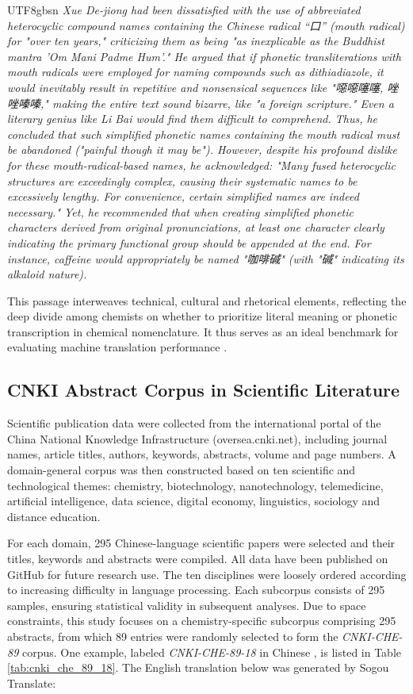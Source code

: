 \documentclass[conference]{IEEEtran}
\begin{document}
\begin{CJK}{UTF8}{gbsn}
\textit{Xue De-jiong had been dissatisfied with the use of abbreviated heterocyclic compound names containing the Chinese radical ``口'' (mouth radical) for "over ten years," criticizing them as being "as inexplicable as the Buddhist mantra 'Om Mani Padme Hum'." He argued that if phonetic transliterations with mouth radicals were employed for naming compounds such as dithiadiazole, it would inevitably result in repetitive and nonsensical sequences like "噁噁噻噻, 唑唑嗪嗪," making the entire text sound bizarre, like "a foreign scripture." Even a literary genius like Li Bai would find them difficult to comprehend. Thus, he concluded that such simplified phonetic names containing the mouth radical must be abandoned ("painful though it may be"). However, despite his profound dislike for these mouth-radical-based names, he acknowledged: "Many fused heterocyclic structures are exceedingly complex, causing their systematic names to be excessively lengthy. For convenience, certain simplified names are indeed necessary." Yet, he recommended that when creating simplified phonetic characters derived from original pronunciations, at least one character clearly indicating the primary functional group should be appended at the end. For instance, caffeine would appropriately be named "咖啡碱" (with "碱" indicating its alkaloid nature).}

This passage interweaves technical, cultural and rhetorical elements, reflecting the deep divide among chemists on whether to prioritize literal meaning or phonetic transcription in chemical nomenclature. It thus serves as an ideal benchmark for evaluating machine translation performance \citep{hejuan2019nomencl,weigang2025xdj}.

\subsection{CNKI Abstract Corpus in Scientific Literature}
Scientific publication data were collected from the international portal of the China National Knowledge Infrastructure (oversea.cnki.net), including journal names, article titles, authors, keywords, abstracts, volume and page numbers. A domain-general corpus was then constructed based on ten scientific and technological themes: chemistry, biotechnology, nanotechnology, telemedicine, artificial intelligence, data science, digital economy, linguistics, sociology and distance education.

For each domain, 295 Chinese-language scientific papers were selected and their titles, keywords and abstracts were compiled. All data have been published on GitHub for future research use. The ten disciplines were loosely ordered according to increasing difficulty in language processing. Each subcorpus consists of 295 samples, ensuring statistical validity in subsequent analyses.
Due to space constraints, this study focuses on a chemistry-specific subcorpus comprising 295 abstracts, from which 89 entries were randomly selected to form the \textit{CNKI-CHE-89} corpus. One example, labeled \textit{CNKI-CHE-89-18} in Chinese \citep{feng2024cjac}, is listed in Table \ref{tab:cnki_che_89_18}. The English translation below was generated by Sogou Translate:


\end{CJK}
\end{document}
